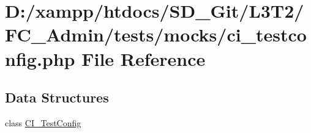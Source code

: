 \hypertarget{ci__testconfig_8php}{}\section{D\+:/xampp/htdocs/\+S\+D\+\_\+\+Git/\+L3\+T2/\+F\+C\+\_\+\+Admin/tests/mocks/ci\+\_\+testconfig.php File Reference}
\label{ci__testconfig_8php}
\subsection*{Data Structures}
\begin{DoxyCompactItemize}
\item 
class \hyperlink{class_c_i___test_config}{C\+I\+\_\+\+Test\+Config}
\end{DoxyCompactItemize}

